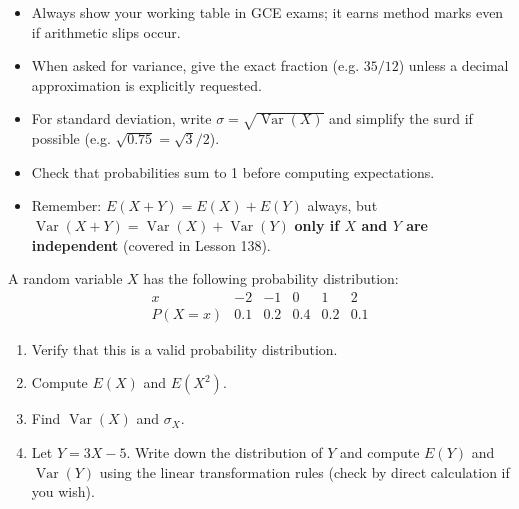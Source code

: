 \documentclass[11pt]{article}
\begin{document}
\begin{attention}
\begin{itemize}
\item Always show your working table in GCE exams; it earns method marks even if arithmetic slips occur.
\item When asked for variance, give the exact fraction (e.g. $35/12$) unless a decimal approximation is explicitly requested.
\item For standard deviation, write $\sigma = \sqrt{\operatorname{Var}(X)}$ and simplify the surd if possible (e.g. $\sqrt{0.75} = \sqrt{3}/2$).
\item Check that probabilities sum to 1 before computing expectations.
\item Remember: $E(X+Y)=E(X)+E(Y)$ always, but $\operatorname{Var}(X+Y)=\operatorname{Var}(X)+\operatorname{Var}(Y)$ \textbf{only if $X$ and $Y$ are independent} (covered in Lesson 138).
\end{itemize}
\end{attention}

\begin{exercice}
A random variable $X$ has the following probability distribution:
\[
\begin{array}{c|ccccc}
x & -2 & -1 & 0 & 1 & 2 \\ \hline
P(X=x) & 0.1 & 0.2 & 0.4 & 0.2 & 0.1
\end{array}
\]
\begin{enumerate}
\item Verify that this is a valid probability distribution.
\item Compute $E(X)$ and $E(X^2)$.
\item Find $\operatorname{Var}(X)$ and $\sigma_X$.
\item Let $Y = 3X - 5$. Write down the distribution of $Y$ and compute $E(Y)$ and $\operatorname{Var}(Y)$ using the linear transformation rules (check by direct calculation if you wish).
\end{enumerate}
\end{exercice}
\end{document}
